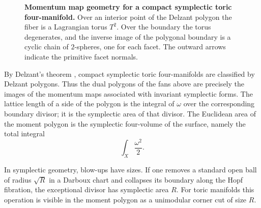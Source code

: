 \documentclass[a4paper,american,11pt]{amsart}
\theoremstyle{plain}
\theoremstyle{definition}
\newcommand{\R}{\mathbb R}
\begin{document}
\begin{figure}[t]
\caption{\textbf{Momentum map geometry for a compact symplectic toric
four-manifold.}  Over an interior point of the Delzant polygon the fiber is a
Lagrangian torus \(T^2\).  Over the boundary the torus degenerates, and the
inverse image of the polygonal boundary is a cyclic chain of \(2\)-spheres,
one for each facet.  The outward arrows indicate the primitive facet normals.}
\label{fig:moment-map-toric}
\end{figure}

By Delzant's theorem \cite{delzant1988hamiltoniens}, compact symplectic
toric four-manifolds are classified by Delzant polygons.  Thus the dual
polygons of the fans above are precisely the images of the momentum maps
associated with invariant symplectic forms.  The lattice length of a side of
the polygon is the integral of \(\omega\) over the corresponding boundary
divisor; it is the symplectic area of that divisor.  The Euclidean area of the
moment polygon is the symplectic four-volume of the surface, namely the total
integral
\[
\int_X \frac{\omega^2}{2}.
\]

In symplectic geometry, blow-ups have sizes.  If one removes a standard open
ball of radius \(\sqrt R\) in a Darboux chart and collapses its boundary
along the Hopf fibration, the exceptional divisor has symplectic area \(R\).
For toric manifolds this operation is visible in the moment polygon as a
unimodular corner cut of size \(R\).
\end{document}
